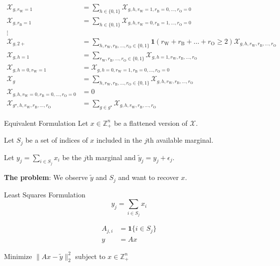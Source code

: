 \documentclass[14pt,aspectratio=169]{beamer}
\newcommand{\var}{\mathcal{X}}
\newcommand{\rc}[1]{r_{\textrm{#1}}}
\begin{document}
\begin{frame}
    \scriptsize
    \begin{align*}
        \var_{g,\rc{W}=1} &= \sum_{h \in \{0,1\}} \var_{g,h,\rc{W}=1, \rc{B}=0, \dots, \rc{O}=0} \tag{White Alone} \\
        \var_{g,\rc{B}=1} &= \sum_{h \in \{0,1\}} \var_{g,h,\rc{W}=0, \rc{B}=1, \dots, \rc{O}=0} \tag{Black or African American Alone} \\
        \vdots \\
        \var_{g,2+} &= \sum_{h,\rc{W},\rc{B},\dots,\rc{O} \in \{0,1\}} \mathbf{1}(\rc{W} + \rc{B} + \dots + \rc{O} \geq 2)\var_{g,h,\rc{W}, \rc{B}, \dots, \rc{O}} \tag{Two or More} \\
        \var_{g,h=1} &= \sum_{\rc{W},\rc{B},\ldots,\rc{O} \in \{0,1\}} \var_{g,h=1,\rc{W},\rc{B},\ldots,\rc{O}} \tag{Hispanic or Latino} \\
        \var_{g,h=0,\rc{W}=1} &= \var_{g,h=0,\rc{W}=1,\rc{B}=0,\ldots,\rc{O}=0} \tag{White Alone, Not Hispanic or Latino} \\
        \var_{g} &= \sum_{h,\rc{W},\rc{B},\dots,\rc{O} \in \{0,1\}} \var_{g,h,\rc{W}, \rc{B}, \dots, \rc{O}} \tag{Overall} \\
        \var_{g,h,\rc{W}=0,\rc{B}=0,\ldots,\rc{O}=0} &= 0 \tag{No race selected} \\
        \var_{g^\star,h,\rc{W},\rc{B},\dots,\rc{O}} &= \sum_{g \in g^\star} \var_{g,h,\rc{W}, \rc{B}, \dots, \rc{O}} \tag{PUMS}
    \end{align*}
\end{frame}


\begin{frame}{Equivalent Formulation}
    Let $x \in \mathbb{Z}_+^n$ be a flattened version of $\var$.

    \bigskip\pause

    Let $S_j$ be a set of indices of $x$ included in the $j$th available marginal.

    \bigskip\pause

    Let $\displaystyle y_j = \sum_{i \in S_j} x_i$ be the $j$th marginal and $\tilde{y}_j = y_j + \epsilon_j$.

    \bigskip\pause

    \textbf{The problem}: We observe $\tilde{y}$ and $S_j$ and want to recover $x$.
\end{frame}


\begin{frame}{Least Squares Formulation}
    $$y_j = \sum_{i \in S_j} x_i$$

    \medskip\pause

    \begin{align*}
        A_{j,i} &= \mathbf{1}\{i \in S_j\} \\
        y &= Ax %
    \end{align*}

    \medskip\pause

    \centering
    Minimize $\|Ax - \tilde{y}\|_2^2$ subject to $x \in \mathbb{Z}_+^n$
\end{frame}
\end{document}
